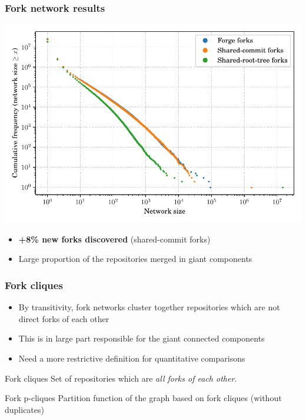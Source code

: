 \documentclass[aspectratio=169,xcolor=table]{beamer}
\begin{document}
    \begin{frame}
        \frametitle{Fork network results}
        \begin{center}
            \includegraphics[width=0.6\linewidth]{../img/forks/fork-network-freq-distribution.pdf}
        \end{center}
        \begin{block}{}
            \begin{itemize}
                \item \textbf{+8\% new forks discovered} (shared-commit forks)
                \item Large proportion of the repositories merged in giant
                    components
            \end{itemize}
        \end{block}
    \end{frame}

    \begin{frame}
        \frametitle{Fork cliques}
        \begin{block}{}
            \begin{itemize}
                \item By transitivity, fork networks cluster together
                    repositories which are not direct forks of each other
                \item This is in large part responsible for the giant connected
                    components
                \item Need a more restrictive definition for quantitative
                    comparisons
            \end{itemize}
        \end{block}

        \begin{block}{Fork cliques}
            Set of repositories which are \emph{all forks of each other}.
        \end{block}

        \begin{block}{Fork p-cliques}
            Partition function of the graph based on fork cliques (without
            duplicates)
        \end{block}
    \end{frame}
\end{document}
